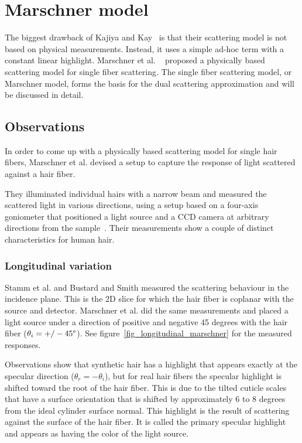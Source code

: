 \documentclass[11pt,a4paper]{report}
\begin{document}
%
%

\section{Marschner model}
\label{sec_marschner}
%
%

The biggest drawback of Kajiya and Kay~\cite{kajiya} is that their scattering model is not based on physical measurements. Instead, it uses a simple ad-hoc term with a constant linear highlight. Marschner et al. ~\cite{marschner} proposed a physically based scattering model for single fiber scattering. The single fiber scattering model, or Marschner model, forms the basis for the dual scattering approximation and will be discussed in detail.


\subsection{Observations}
%
%
 
In order to come up with a physically based scattering model for single hair fibers, Marschner et al. devised a setup to capture the response of light scattered against a hair fiber. 

They illuminated individual hairs with a narrow beam and measured the scattered light in various directions, using a setup based on a four-axis goniometer that positioned a light source and a CCD camera at arbitrary directions from the sample~\cite{marschner}. Their measurements show a couple of distinct characteristics for human hair.

\subsubsection{Longitudinal variation}
\label{sec_longitudinal_observation}

Stamm et al. and Bustard and Smith measured the scattering behaviour in the incidence plane. This is the 2D slice for which the hair fiber is coplanar with the source and detector. Marschner et al. did the same measurements and placed a light source under a direction of positive and negative 45 degrees with the hair fiber ($\theta_i = +/- 45\degree$). See figure~\ref{fig_longitudinal_marschner} for the measured responses.

Observations show that synthetic hair has a highlight that appears exactly at the specular direction ($\theta_r = -\theta_i$), but for real hair fibers the specular highlight is shifted toward the root of the hair fiber. This is due to the tilted cuticle scales that have a surface orientation that is shifted by approximately 6 to 8 degrees from the ideal cylinder surface normal. This highlight is the result of scattering against the surface of the hair fiber. It is called the primary specular highlight and appears as having the color of the light source.
\end{document}
